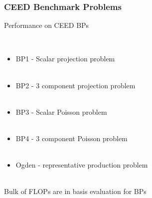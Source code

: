 \documentclass{beamer}
\begin{document}
\begin{frame}
\begin{center}
\frametitle{CEED Benchmark Problems}

Performance on CEED BPs

~\\

\begin{itemize}

\item BP1 - Scalar projection problem\\

~\\

\item BP2 - 3 component projection problem\\

~\\

\item BP3 - Scalar Poisson problem\\

~\\

\item BP4 - 3 component Poisson problem\\

~\\

\item Ogden - representative production problem\\

\end{itemize}

~\\

Bulk of FLOPs are in basis evaluation for BPs

\end{center}
\end{frame}

\end{document}
